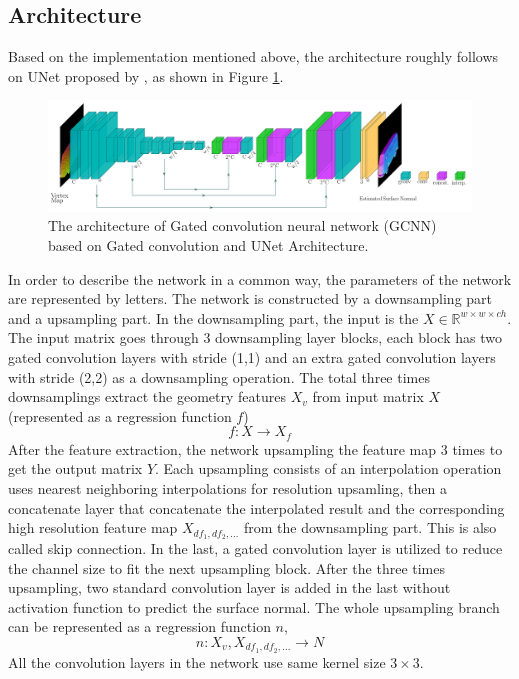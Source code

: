 
\subsection{Architecture}
\label{sec:architecture}
Based on the implementation mentioned above, the architecture roughly follows on UNet proposed by \cite{unet}, as shown in Figure \ref{fig:gcnn-archi}. 

\begin{figure}
	\centering
	\includegraphics[width=1\textwidth]{Figures/gcnn}
	\caption{The architecture of Gated convolution neural network (GCNN) based on Gated convolution and UNet Architecture.}
	\label{fig:gcnn-archi}
\end{figure}
In order to describe the network in a common way, the parameters of the network are represented by letters.
The network is constructed by a downsampling part and a upsampling part. In the downsampling part, the input is the $ X \in \mathbb{R}^{w\times w\times ch}$. The input matrix goes through 3 downsampling layer blocks, each block has two gated convolution layers with stride (1,1) and an extra gated convolution layers with stride (2,2) as a downsampling operation. 
The total three times downsamplings extract the geometry features $ X_v $ from input matrix $ X $ (represented as a regression function $ f $)
\[ f: X \rightarrow X_f \]
After the feature extraction, the network upsampling the feature map 3 times to get the output matrix $ Y $. Each upsampling consists of an interpolation operation uses nearest neighboring interpolations for resolution upsamling, then a concatenate layer that concatenate the interpolated result and the corresponding high resolution feature map  $ X_{df_1, df_2, ...} $  from the downsampling part. This is also called skip connection. In the last, a gated convolution layer is utilized to reduce the channel size to fit the next upsampling block. After the three times upsampling, two standard convolution layer is added in the last without activation function to predict the surface normal. The whole upsampling branch can be represented as a regression function $ n $,
\[ n: X_v, X_{df_1, df_2, ...} \rightarrow N \]
All the convolution layers in the network use same kernel size $ 3\times 3 $. 

